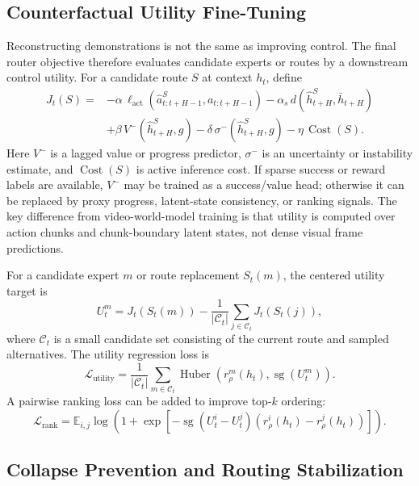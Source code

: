\documentclass[10pt]{article}
\newcommand{\sg}{\operatorname{sg}}
\newcommand{\Cost}{\operatorname{Cost}}
\begin{document}
\subsection{Counterfactual Utility Fine-Tuning}

Reconstructing demonstrations is not the same as improving control. The final router objective therefore evaluates candidate experts or routes by a downstream control utility. For a candidate route $S$ at context $h_t$, define
\begin{align}
J_t(S)=&-\alpha\,\ell_{\mathrm{act}}(\hat{a}_{t:t+H-1}^{S},a_{t:t+H-1})
-\alpha_s\,d(\hat{h}_{t+H}^{S},\bar{h}_{t+H}) \nonumber\\
&+\beta\,V^{-}(\hat{h}_{t+H}^{S},g)
-\delta\,\sigma^{-}(\hat{h}_{t+H}^{S},g)
-\eta\,\Cost(S).
\label{eq:utility}
\end{align}
Here $V^{-}$ is a lagged value or progress predictor, $\sigma^{-}$ is an uncertainty or instability estimate, and $\Cost(S)$ is active inference cost. If sparse success or reward labels are available, $V^{-}$ may be trained as a success/value head; otherwise it can be replaced by proxy progress, latent-state consistency, or ranking signals. The key difference from video-world-model training is that utility is computed over action chunks and chunk-boundary latent states, not dense visual frame predictions.

For a candidate expert $m$ or route replacement $S_t(m)$, the centered utility target is
\begin{equation}
 U_t^m = J_t(S_t(m)) - \frac{1}{|\mathcal{C}_t|}\sum_{j\in\mathcal{C}_t}J_t(S_t(j)),
\end{equation}
where $\mathcal{C}_t$ is a small candidate set consisting of the current route and sampled alternatives. The utility regression loss is
\begin{equation}
 \mathcal{L}_{\mathrm{utility}} =
 \frac{1}{|\mathcal{C}_t|}\sum_{m\in\mathcal{C}_t}
 \operatorname{Huber}(r_\rho^m(h_t),\sg(U_t^m)).
 \label{eq:utility_loss}
\end{equation}
A pairwise ranking loss can be added to improve top-$k$ ordering:
\begin{equation}
\mathcal{L}_{\mathrm{rank}}=\mathbb{E}_{i,j}\log\left(1+\exp[-\sg(U_t^i-U_t^j)(r_\rho^i(h_t)-r_\rho^j(h_t))]\right).
\end{equation}

\subsection{Collapse Prevention and Routing Stabilization}
\end{document}
